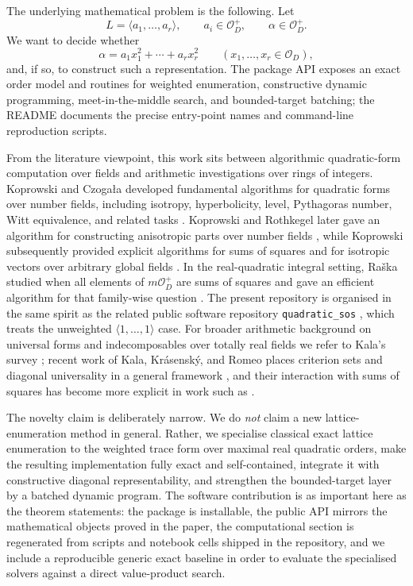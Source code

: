 \documentclass[manuscript]{acmart}
\theoremstyle{plain}
\theoremstyle{definition}
\theoremstyle{nonitalicremark}
\newcommand{\OO}{\mathcal{O}}
\newcommand{\OD}{\OO_D}
\begin{document}
The underlying mathematical problem is the following. Let
\[
L=\langle a_1,\dots,a_r\rangle,
\qquad a_i\in\OD^+,
\qquad \alpha\in\OD^+.
\]
We want to decide whether
\[
\alpha = a_1x_1^2+\cdots+a_rx_r^2
\qquad (x_1,\dots,x_r\in\OD),
\]
and, if so, to construct such a representation. The package API exposes an exact order
model and routines for weighted enumeration, constructive dynamic programming,
meet-in-the-middle search, and bounded-target batching; the README documents the
precise entry-point names and command-line reproduction scripts.

From the literature viewpoint, this work sits between algorithmic quadratic-form computation over
fields and arithmetic investigations over rings of integers. Koprowski and Czoga{\l}a developed
fundamental algorithms for quadratic forms over number fields, including isotropy, hyperbolicity,
level, Pythagoras number, Witt equivalence, and related tasks \cite{KopCz}. Koprowski and
Rothkegel later gave an algorithm for constructing anisotropic parts over number fields
\cite{KopRoth}, while Koprowski subsequently provided explicit algorithms for sums of squares and
for isotropic vectors over arbitrary global fields \cite{KopSq,KopIso}. In the real-quadratic
integral setting, Ra\v ska studied when all elements of $m\OD^+$ are sums of squares and gave an
efficient algorithm for that family-wise question \cite{Raska}. The present repository is organised
in the same spirit as the related public software repository \texttt{quadratic\_sos} \cite{KaniaQSOS},
which treats the unweighted $\langle 1,\dots,1\rangle$ case. For broader arithmetic background on universal forms and
indecomposables over totally real fields we refer to Kala's survey \cite{KalaSurvey}; recent work
of Kala, Kr\'asensk\'y, and Romeo places criterion sets and diagonal universality in a general
framework \cite{KKR}, and their interaction with sums of squares has become more explicit in work
such as \cite{KKK}.

The novelty claim is deliberately narrow. We do \emph{not} claim a new lattice-enumeration method
in general. Rather, we specialise classical exact lattice enumeration to the weighted trace form
over maximal real quadratic orders, make the resulting implementation fully exact and self-contained,
integrate it with constructive diagonal representability, and strengthen the bounded-target layer by
a batched dynamic program. The software contribution is as important here as the theorem statements:
the package is installable, the public API mirrors the mathematical objects proved in the paper, the
computational section is regenerated from scripts and notebook cells shipped in the repository, and
we include a reproducible generic exact baseline in order to evaluate the specialised solvers against
a direct value-product search.
\end{document}
